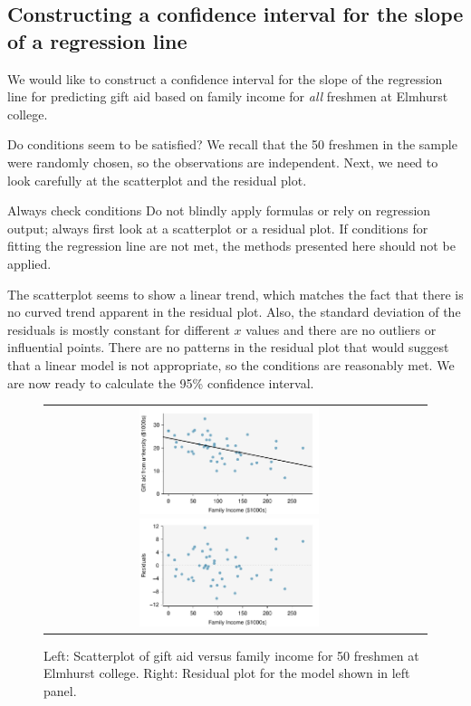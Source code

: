 \subsection{Constructing a confidence interval for the slope of a regression line}


We would like to construct a confidence interval for the slope of the regression line for predicting gift aid based on family income for \emph{all} freshmen at Elmhurst college.  



Do conditions seem to be satisfied?  We recall that the 50 freshmen in the sample were randomly chosen, so the observations are independent.  Next, we need to look carefully at the scatterplot and the residual plot.  


\begin{onebox}{Always check conditions}
Do not blindly apply formulas or rely on regression output; always first look at a scatterplot or a residual plot.  If conditions for fitting the regression line are not met, the methods presented here should not be applied. 
\end{onebox}

The scatterplot seems to show a linear trend, which matches the fact that there is no curved trend apparent in the residual plot.  Also, the standard deviation of the residuals is mostly constant for different $x$ values and there are no outliers or influential points.  There are no patterns in the residual plot that would suggest that a linear model is not appropriate, so the conditions are reasonably met.  We are now ready to calculate the 95\% confidence interval.  

\begin{figure}%
   \centering
  \begin{tabular}{cc}
   \includegraphics[width=0.5\textwidth]{ch_regr_simple_linear/figures/elmhurstInference/elmhurstScatter}
   \includegraphics[width=0.5\textwidth]{ch_regr_simple_linear/figures/elmhurstInference/elmhurstResidual}
\end{tabular}
   \caption{Left: Scatterplot of gift aid versus family income for 50 freshmen at Elmhurst college.  Right: Residual plot for the model shown in left panel.  }
\label{elmhurstInferencePlots}
\end{figure}




